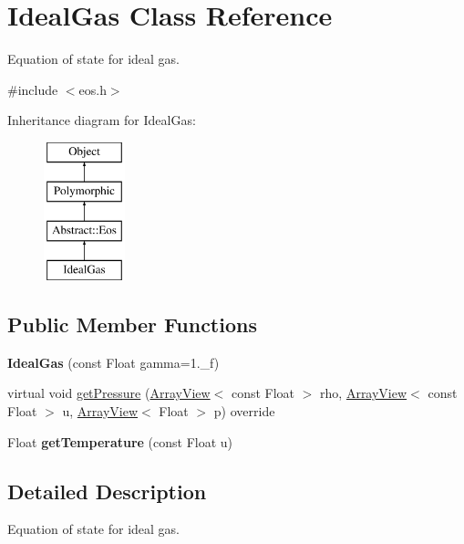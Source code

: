 \hypertarget{classIdealGas}{}\section{Ideal\+Gas Class Reference}
\label{classIdealGas}


Equation of state for ideal gas.  




{\ttfamily \#include $<$eos.\+h$>$}

Inheritance diagram for Ideal\+Gas\+:\begin{figure}[H]
\begin{center}
\leavevmode
\includegraphics[height=4.000000cm]{classIdealGas}
\end{center}
\end{figure}
\subsection*{Public Member Functions}
\begin{DoxyCompactItemize}
\item 
\hypertarget{classIdealGas_af250b5658ce51009456179871042a230}{}\label{classIdealGas_af250b5658ce51009456179871042a230} 
{\bfseries Ideal\+Gas} (const Float gamma=1.\+\_\+f)
\item 
virtual void \hyperlink{classIdealGas_a27ee0a167bbb7e5690ce6db5fca39ba1}{get\+Pressure} (\hyperlink{classArrayView}{Array\+View}$<$ const Float $>$ rho, \hyperlink{classArrayView}{Array\+View}$<$ const Float $>$ u, \hyperlink{classArrayView}{Array\+View}$<$ Float $>$ p) override
\item 
\hypertarget{classIdealGas_a58790f488c2e64054514de0ee170a268}{}\label{classIdealGas_a58790f488c2e64054514de0ee170a268} 
Float {\bfseries get\+Temperature} (const Float u)
\end{DoxyCompactItemize}


\subsection{Detailed Description}
Equation of state for ideal gas. 

